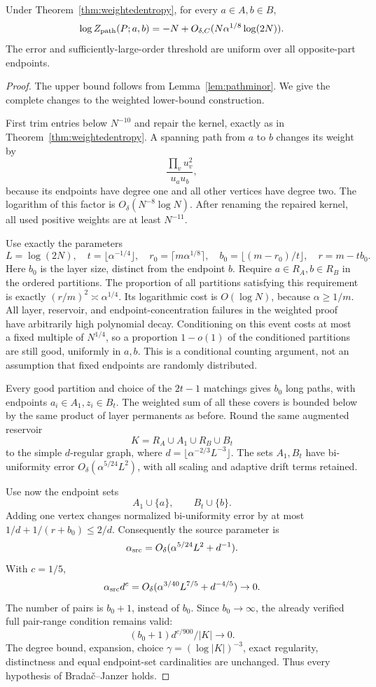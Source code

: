 \begin{theorem}
\label{thm:bipartitepathentropy}
Under Theorem~\ref{thm:weightedentropy}, for every
\(a\in A,b\in B\),
\[
 \log Z_{\rm path}(P;a,b)
       =-N+O_{\delta,C}(N\alpha^{1/8}\log(2N)).
\]
The error and sufficiently-large-order threshold are uniform
over all opposite-part endpoints.
\end{theorem}
\begin{proof}
The upper bound follows from Lemma~\ref{lem:pathminor}.
We give the complete changes to the weighted lower-bound
construction.

First trim entries below \(N^{-10}\) and repair the kernel,
exactly as in Theorem~\ref{thm:weightedentropy}.
A spanning path from \(a\) to \(b\) changes its weight by
\[
 \frac{\prod_v u_v^2}{u_a u_b},
\]
because its endpoints have degree one and all other vertices
have degree two.
The logarithm of this factor is \(O_\delta(N^{-8}\log N)\).
After renaming the repaired kernel, all used positive
weights are at least \(N^{-11}\).

Use exactly the parameters
\[
 L=\log(2N),\quad
 t=\lfloor\alpha^{-1/4}\rfloor,\quad
 r_0=\lceil m\alpha^{1/8}\rceil,\quad
 b_0=\lfloor(m-r_0)/t\rfloor,\quad r=m-tb_0 .
\]
Here \(b_0\) is the layer size, distinct from the endpoint \(b\).
Require \(a\in R_A,b\in R_B\) in the ordered partitions.
The proportion of all partitions satisfying this requirement
is exactly \((r/m)^2\asymp\alpha^{1/4}\).
Its logarithmic cost is \(O(\log N)\), because
\(\alpha\geq1/m\).
All layer, reservoir, and endpoint-concentration failures
in the weighted proof have arbitrarily high polynomial
decay. Conditioning on this event costs at most a fixed
multiple of \(N^{1/4}\), so a proportion \(1-o(1)\) of the
conditioned partitions are still good, uniformly in \(a,b\).
This is a conditional counting argument, not an assumption
that fixed endpoints are randomly distributed.

Every good partition and choice of the \(2t-1\) matchings
gives \(b_0\) long paths, with endpoints
\(a_i\in A_1,z_i\in B_t\).
The weighted sum of all these covers is bounded below
by the same product of layer permanents as before.
Round the same augmented reservoir
\[
 K=R_A\cup A_1\cup R_B\cup B_t
\]
to the simple \(d\)-regular graph, where
\(d=\lfloor\alpha^{-2/3}L^{-3}\rfloor\).
The sets \(A_1,B_t\) have bi-uniformity error
\(O_\delta(\alpha^{5/24}L^2)\), with all scaling and
adaptive drift terms retained.

Use now the endpoint sets
\[
 A_1\cup\{a\},\qquad B_t\cup\{b\}.
\]
Adding one vertex changes normalized bi-uniformity error
by at most \(1/d+1/(r+b_0)\leq2/d\).
Consequently the source parameter is
\[
 \alpha_{\rm src}
    =O_\delta(\alpha^{5/24}L^2+d^{-1}).
\]
With \(c=1/5\),
\[
 \alpha_{\rm src}d^c
       =O_\delta(\alpha^{3/40}L^{7/5}+d^{-4/5})\to0 .
\]
The number of pairs is \(b_0+1\), instead of \(b_0\).
Since \(b_0\to\infty\), the already verified full pair-range
condition remains valid:
\[
 (b_0+1)d^{c/900}/|K|\to0.
\]
The degree bound, expansion, choice
\(\gamma=(\log|K|)^{-3}\), exact regularity, distinctness
and equal endpoint-set cardinalities are unchanged.
Thus every hypothesis of Brada\v{c}--Janzer
\cite[Theorem 6.4]{BJ} holds.


\end{proof}

